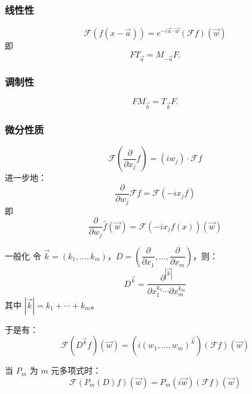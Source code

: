 \documentclass[12pt,a4paper]{article}
\numberwithin{subsection}{section}   %
\numberwithin{subsubsection}{subsection}
\theoremstyle{plain}
\theoremstyle{definition}
\theoremstyle{remark}
\theoremstyle{remark}
\begin{document}
\subsubsection{线性性}
\begin{equation}
	\mathcal{F}(f(x - \vec{a})) = e^{-i \vec{a} \cdot \vec{w}} (\mathcal{F}f)(\vec{w})
\end{equation}
即
\begin{equation}
	F T_{\vec{a}} = M_{-\vec{a}} F.
\end{equation}

\subsubsection{调制性}
\begin{equation}
	F M_{\vec{b}} = T_{\vec{b}} F.
\end{equation}

\subsubsection{微分性质}
\begin{equation}
	\mathcal{F}\left(\dfrac{\partial}{\partial x_j} f\right) = (i w_j) \cdot \mathcal{F}f
\end{equation}
进一步地：
\begin{equation}
	\dfrac{\partial}{\partial w_j} \mathcal{F}f = \mathcal{F}\left(-i x_j f\right)
\end{equation}
即
\begin{equation}
	\dfrac{\partial}{\partial w_j} \hat{f}(\vec{w}) = \mathcal{F}\left(-i x_j f(x)\right)(\vec{w})
\end{equation}

一般化
令 \(\vec{k} = (k_1, \dots, k_m)\)，\(D = \left(\dfrac{\partial}{\partial x_1}, \dots, \dfrac{\partial}{\partial x_m}\right)\)，则：
\begin{equation}
	D^{\vec{k}} = \dfrac{\partial^{|\vec{k}|}}{\partial x_1^{k_1} \cdots \partial x_m^{k_m}}
\end{equation}
其中 \(|\vec{k}| = k_1 + \cdots + k_m\)。

于是有：
\begin{equation}
	\mathcal{F}(D^{\vec{k}} f)(\vec{w}) = \left(i (w_1, \dots, w_m)^{\vec{k}}\right) (\mathcal{F}f)(\vec{w})
\end{equation}

当 \(P_m\) 为 \(m\) 元多项式时：
\begin{equation}
	\mathcal{F}(P_m(D) f)(\vec{w}) = P_m(i \vec{w}) (\mathcal{F}f)(\vec{w})
\end{equation}
\end{document}
